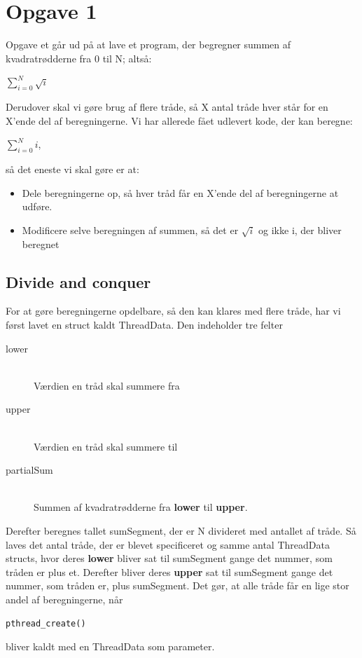 \section{Opgave 1}
Opgave et går ud på at lave et program, der begregner summen af kvadratrødderne fra 0 til N; altså:
\begin{center}
$\displaystyle\sum_{i=0}^{N} \sqrt{i}$
\end{center}
Derudover skal vi gøre brug af flere tråde, så X antal tråde hver står for en X'ende del af beregningerne. Vi har allerede fået udlevert kode, der kan beregne:

\begin{center}
$\displaystyle\sum_{i=0}^{N} i$,
\end{center}
så det eneste vi skal gøre er at:

\begin{itemize}
\item Dele beregningerne op, så hver tråd får en X'ende del af beregningerne at udføre.
\item Modificere selve beregningen af summen, så det er $\sqrt{i}$ og ikke i, der bliver beregnet
\end{itemize}

\subsection{Divide and conquer}
For at gøre beregningerne opdelbare, så den kan klares med flere tråde, har vi først lavet en struct kaldt ThreadData. Den indeholder tre felter
\begin{description}
\item[lower] \hfill \\ Værdien en tråd skal summere fra
\item[upper] \hfill \\ Værdien en tråd skal summere til
\item[partialSum] \hfill \\ Summen af kvadratrødderne fra \textbf{lower} til \textbf{upper}. 
\end{description}

Derefter beregnes tallet sumSegment, der er N divideret med antallet af tråde. Så laves det antal tråde, der er blevet specificeret og samme antal ThreadData structs, hvor deres \textbf{lower} bliver sat til sumSegment gange det nummer, som tråden er plus et. Derefter bliver deres \textbf{upper} sat til sumSegment gange det nummer, som tråden er, plus sumSegment. Det gør, at alle tråde får en lige stor andel af beregningerne, når \begin{verbatim}pthread_create()\end{verbatim} bliver kaldt med en ThreadData som parameter. 

